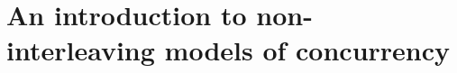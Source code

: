 \chapter{An introduction to non-interleaving models of concurrency}
\label{chap:An introduction to models for true concurrency}







